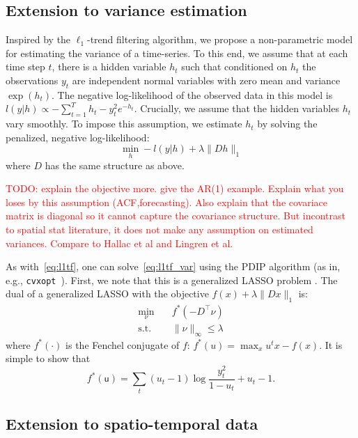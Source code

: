\documentclass{article}
\newcommand{\alert}[1]{\textcolor{red}{TODO: #1}}
\begin{document}
\subsection{Extension to variance estimation}
\label{sec:l1tf_var}


Inspired by the $\ell_1$-trend filtering algorithm, we propose a non-parametric model for estimating the variance of a time-series. To this end, we assume that at each time step $t$, there is a hidden variable $h_t$ such that conditioned on $h_t$ the observations $y_t$ are independent normal variables with zero mean and variance $\exp(h_t)$. The negative log-likelihood of the observed data in this model is $l(y|h) \propto -\sum_{t=1}^Th_t - y_t^2e^{-h_t}$. Crucially, we assume that the hidden variables $h_t$ vary smoothly. To impose this assumption, we estimate $h_t$ by solving the penalized, negative log-likelihood:
\begin{equation}
\min_h -l(y|h)+\lambda \lVert Dh \lVert_1
\label{eq:l1tf_var}
\end{equation}
 where $D$ has the same structure as above.

\alert{explain the objective more. give the AR(1) example. Explain what you loses by this assumption (ACF,forecasting). Also explain that the covariace matrix is diagonal so it cannot capture the covariance structure. But incontrast to spatial stat literature, it does not make any assumption on estimated variances. Compare to Hallac et al and Lingren et al.}

As with~\eqref{eq:l1tf}, one can solve~\eqref{eq:l1tf_var} using the PDIP algorithm (as in, e.g., \texttt{cvxopt}~\citep{andersen_cvxopt:_2013}). First, we note that this is a generalized LASSO problem \citep{tibshirani_solution_2011}. The dual of a generalized LASSO with the objective $f(x)+\lambda \lVert Dx \lVert_1$ is: 
\begin{align}
\min_\nu&\quad f^*(-D^\top\nu) \\
\mbox{s.t.}&\quad \lVert \nu \lVert_\infty \le \lambda
\end{align}
 where $f^*(\cdot)$ is the Fenchel conjugate of $f$: $f^*(u)=\max_x u^tx-f(x)$. It is simple to show that 
\begin{equation}
f^*(\mathsf{u})=\sum_t (u_t-1)\log\frac{y_t^2}{1-u_t} + u_t-1.
\label{eq:conj}
\end{equation}



\subsection{Extension to spatio-temporal data}
\label{sec:exten}
\end{document}

